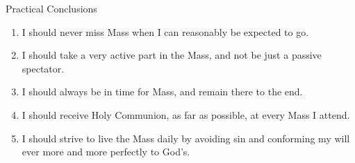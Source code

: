 \documentclass{beamer}
\begin{document}
\begin{frame}{Practical Conclusions}
\begin{enumerate}
\item   I should never miss Mass when I can reasonably be expected to go.
\item   I should take a very active part  in  the  Mass,  and  not  be  just  a
  passive spectator.
\item   I should always be in time for Mass, and remain there to the end.
\item   I should receive Holy Communion, as far as possible, at  every  Mass  I
  attend.
\item   I should strive to live the Mass daily by avoiding sin  and  conforming
  my will ever more and more perfectly to God's.
\end{enumerate}
\end{frame}
\end{document}
